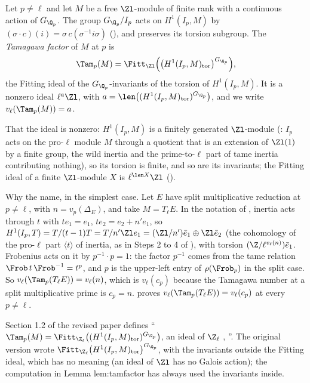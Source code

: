\begin{definition}\label{def:blochkato:tamagawa}
Let $p\ne\ell$ and let $M$ be a free $\Zl$-module of finite rank with a continuous action of $G_{\Q_p}$. The group $G_{\Q_p}/I_p$ acts on $H^1(I_p,M)$ by
$(\sigma\cdot c)(i)=\sigma\,c(\sigma^{-1}i\sigma)$ (), and preserves its torsion subgroup. The \emph{Tamagawa factor} of $M$ at $p$ is
\[
\Tam_p(M)=\Fitt_{\Zl}\Bigl(\bigl(H^1(I_p,M)_{\mathrm{tor}}\bigr)^{G_{\Q_p}}\Bigr),
\]
the Fitting ideal of the $G_{\Q_p}$-invariants of the torsion of $H^1(I_p,M)$. It is a nonzero ideal $\ell^a\Zl$, with $a=\len\bigl((H^1(I_p,M)_{\mathrm{tor}})^{G_{\Q_p}}\bigr)$, and we write
$v_\ell(\Tam_p(M))=a$.
\end{definition}

That the ideal is nonzero: $H^1(I_p,M)$ is a finitely generated $\Zl$-module (: $I_p$ acts on the pro-$\ell$ module $M$ through a quotient that is an
extension of $\Zl(1)$ by a finite group, the wild inertia and the prime-to-$\ell$ part of tame inertia contributing nothing), so its torsion is finite, and so are its
invariants; the Fitting ideal of a finite $\Zl$-module $X$ is $\ell^{\len X}\Zl$ ().

Why the name, in the simplest case. Let $E$ have split multiplicative reduction at $p\ne\ell$, with $n=v_p(\Delta_E)$, and take $M=T_\ell E$. In the notation of
, inertia acts through $t$ with $te_1=e_1$, $te_2=e_2+n'e_1$, so $H^1(I_p,T)=T/(t-1)T=T/n'\Zl e_1=(\Zl/n')\bar e_1\oplus\Zl\bar e_2$ (the
cohomology of the pro-$\ell$ part $\langle t\rangle$ of inertia, as in Steps 2 to 4 of ), with torsion $(\Z/\ell^{v_\ell(n)})\bar e_1$. Frobenius acts on
it by $p^{-1}\cdot p=1$: the factor $p^{-1}$ comes from the tame relation $\Frob\,t\,\Frob^{-1}=t^p$, and $p$ is the upper-left entry of $\rho(\Frob_p)$ in the split case. So
$v_\ell(\Tam_p(T_\ell E))=v_\ell(n)$, which is $v_\ell(c_p)$ because the Tamagawa number at a split multiplicative prime is $c_p=n$.  proves
$v_\ell(\Tam_p(T_\ell E))=v_\ell(c_p)$ at every $p\ne\ell$.

\begin{paperlink}
\sloppy Section 1.2 of the revised paper defines ``$\Tam_p(M)=\Fitt_{\Z_\ell}\bigl((H^1(I_p,M)_{\mathrm{tor}})^{G_{\Q_p}}\bigr)$, an ideal of $\Z_\ell$ \cite[p.~708]{DFG04},
\cite[I.4.2.2]{FPR94}''. The original version wrote $\Fitt_{\Z_\ell}\bigl(H^1(I_p,M)_{\mathrm{tor}}\bigr)^{G_{\Q_p}}$, with the invariants outside the Fitting ideal, which has no
meaning (an ideal of $\Zl$ has no Galois action); the computation in Lemma lem:tamfactor has always used the invariants inside.
\end{paperlink}

